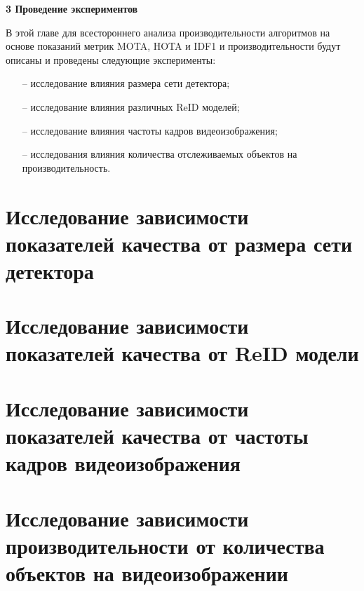 \newpage
\begin{flushleft}
  \textbf{\large 3 Проведение экспериментов}
\end{flushleft}
В этой главе для всестороннего анализа производительности алгоритмов на основе показаний метрик MOTA, HOTA и IDF1 и производительности будут описаны и проведены следующие эксперименты:
\begin{itemize}
  \item[--] исследование влияния размера сети детектора;
  \item[--] исследование влияния различных ReID моделей;
  \item[--] исследование влияния частоты кадров видеоизображения;
  \item[--] исследования влияния количества отслеживаемых объектов на производительность.
\end{itemize}


\section{Исследование зависимости показателей качества от размера сети детектора}



\section{Исследование зависимости показателей качества от ReID модели}


\section{Исследование зависимости показателей качества от частоты кадров видеоизображения}


\section{Исследование зависимости производительности от количества объектов на видеоизображении}


